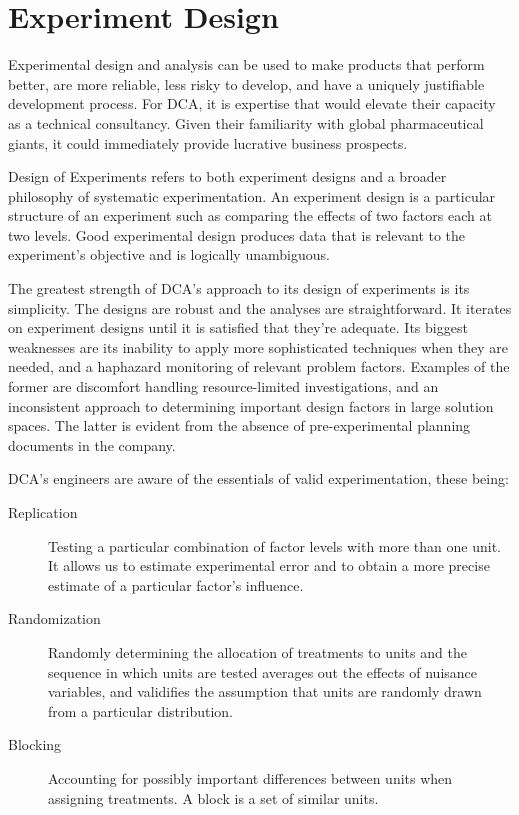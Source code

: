 \documentclass[11pt,a4paper,article]{memoir} %
\begin{document}
\section{Experiment Design}
Experimental design and analysis can be used to make products that perform better, are more reliable, less risky to develop, and have a uniquely justifiable development process. For DCA, it is expertise that would elevate their capacity as a technical consultancy. Given their familiarity with global pharmaceutical giants, it could immediately provide lucrative business prospects.
\par
Design of Experiments refers to both experiment designs and a broader philosophy of systematic experimentation. An experiment design is a particular structure of an experiment such as comparing the effects of two factors each at two levels. Good experimental design produces data that is relevant to the experiment's objective and is logically unambiguous.
\par
The greatest strength of DCA's approach to its design of experiments is its simplicity. The designs are robust and the analyses are straightforward. It iterates on experiment designs until it is satisfied that they're adequate. Its biggest weaknesses are its inability to apply more sophisticated techniques when they are needed, and a haphazard monitoring of relevant problem factors. Examples of the former are discomfort handling resource-limited investigations, and an inconsistent approach to determining important design factors in large solution spaces. The latter is evident from the absence of pre-experimental planning documents in the company.
\par
DCA's engineers are aware of the essentials of valid experimentation, these being:
\begin{description}
\item[Replication]{Testing a particular combination of factor levels with more than one unit. It allows us to estimate experimental error and to obtain a more precise estimate of a particular factor's influence.}
\item[Randomization]{Randomly determining the allocation of treatments to units and the sequence in which units are tested averages out the effects of nuisance variables, and validifies the assumption that units are randomly drawn from a particular distribution.}
\item[Blocking]{Accounting for possibly important differences between units when assigning treatments. A block is a set of similar units.}
\end{description}
\end{document}
